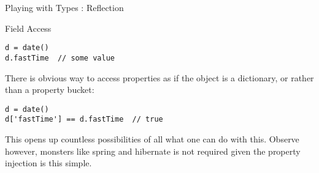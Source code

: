 \begin{section}{Playing with Types : Reflection}
\begin{subsection}{Field Access}
\begin{lstlisting}[style=JexlStyle]
d = date()
d.fastTime  // some value 
\end{lstlisting}

There is obvious way to access properties
as if the object is a dictionary, or rather than a property bucket:
\begin{lstlisting}[style=JexlStyle]
d = date()
d['fastTime'] == d.fastTime  // true 
\end{lstlisting}
This opens up countless possibilities of all what one can do with this.
Observe however, monsters like spring and hibernate is not required 
given the property injection is this simple. 
\end{subsection}



\end{section}
























